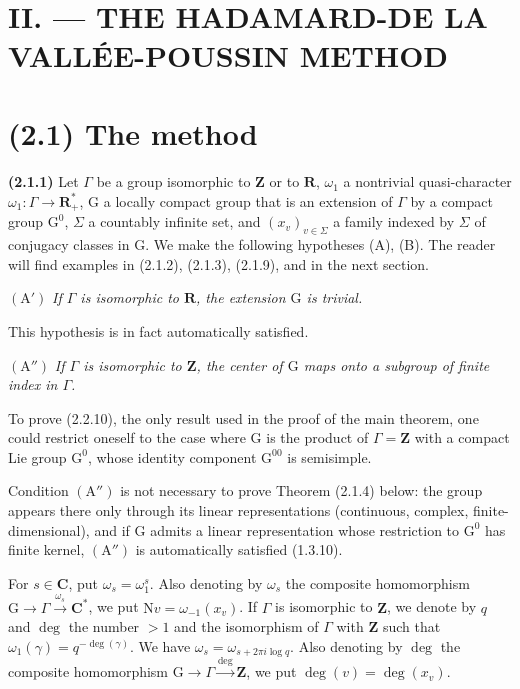 \documentclass[11pt,leqno]{article}
\newcommand{\Page}[1]{\ifvmode\noindent\else\unskip\ \fi{\footnotesize\textcolor{gray}{[p.\,#1]}}\ \ignorespaces}
\begin{document}
\Page{187}
\section*{II. — THE HADAMARD-DE LA VALLÉE-POUSSIN METHOD}

\section*{(2.1) The method}

\textbf{(2.1.1)} Let \(\Gamma\) be a group isomorphic to \(\mathbf{Z}\) or to \(\mathbf{R}\), \(\omega_1\) a nontrivial quasi-character \(\omega_1:\Gamma\to\mathbf{R}_+^*\), \(\mathrm{G}\) a locally compact group that is an extension of \(\Gamma\) by a compact group \(\mathrm{G}^0\), \(\Sigma\) a countably infinite set, and \((x_v)_{v\in\Sigma}\) a family indexed by \(\Sigma\) of conjugacy classes in \(\mathrm{G}\). We make the following hypotheses (A), (B). The reader will find examples in (2.1.2), (2.1.3), (2.1.9), and in the next section.

\((\mathrm{A}')\) \textit{If \(\Gamma\) is isomorphic to \(\mathbf{R}\), the extension \(\mathrm{G}\) is trivial.}

This hypothesis is in fact automatically satisfied.

\((\mathrm{A}'')\) \textit{If \(\Gamma\) is isomorphic to \(\mathbf{Z}\), the center of \(\mathrm{G}\) maps onto a subgroup of finite index in \(\Gamma\).}

To prove (2.2.10), the only result used in the proof of the main theorem, one could restrict oneself to the case where \(\mathrm{G}\) is the product of \(\Gamma=\mathbf{Z}\) with a compact Lie group \(\mathrm{G}^0\), whose identity component \(\mathrm{G}^{00}\) is semisimple.

Condition \((\mathrm{A}'')\) is not necessary to prove Theorem (2.1.4) below: the group appears there only through its linear representations (continuous, complex, finite-dimensional), and if \(\mathrm{G}\) admits a linear representation whose restriction to \(\mathrm{G}^0\) has finite kernel, \((\mathrm{A}'')\) is automatically satisfied (1.3.10).

For \(s\in\mathbf{C}\), put \(\omega_s=\omega_1^s\). Also denoting by \(\omega_s\) the composite homomorphism \(\mathrm{G}\to\Gamma\xrightarrow{\omega_s}\mathbf{C}^*\), we put \(\mathrm{N}v=\omega_{-1}(x_v)\). If \(\Gamma\) is isomorphic to \(\mathbf{Z}\), we denote by \(q\) and \(\deg\) the number \(>1\) and the isomorphism of \(\Gamma\) with \(\mathbf{Z}\) such that \(\omega_1(\gamma)=q^{-\deg(\gamma)}\). We have \(\omega_s=\omega_{s+2\pi i\log q}\). Also denoting by \(\deg\) the composite homomorphism \(\mathrm{G}\to\Gamma\xrightarrow{\deg}\mathbf{Z}\), we put \(\deg(v)=\deg(x_v)\).
\end{document}
